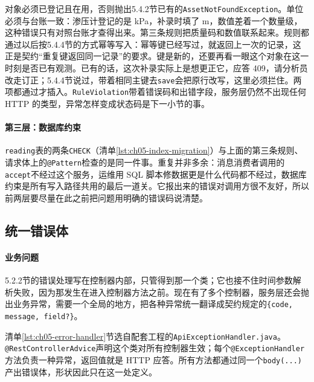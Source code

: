 对象必须已登记且在用，否则抛出5.4.2节已有的\texttt{AssetNotFoundException}。单位必须与台账一致：渗压计登记的是 kPa，补录时填了 m，数值差着一个数量级，这种错误只有对照台账才查得出来。第三条规则把质量码和数值联系起来。规则都通过以后按5.4.4节的方式幂等写入：幂等键已经写过，就返回上一次的记录，这正是契约“重复键返回同一记录”的要求。键是新的，还要再看一眼这个对象在这一时刻是否已有观测。已有的话，这次补录实际上是想更正它，应答 409，请分析员改走订正；5.4.4节说过，带着相同主键去\texttt{save}会把原行改写，这里必须拦住。两项都通过才插入。\texttt{RuleViolation}带着错误码和出错字段，服务层仍然不出现任何 HTTP 的类型，异常怎样变成状态码是下一小节的事。

\paragraph{第三层：数据库约束}\texttt{reading}表的两条\texttt{CHECK}（清单\ref{lst:ch05-index-migration}）与上面的第三条规则、请求体上的\texttt{@Pattern}检查的是同一件事。重复并非多余：消息消费者调用的\texttt{accept}不经过这个服务，运维用 SQL 脚本修数据更是什么代码都不经过，数据库约束是所有写入路径共用的最后一道关。它报出来的错误对调用方很不友好，所以前两层要尽量在此之前把问题用明确的错误码说清楚。

\subsection{统一错误体}

\paragraph{业务问题}5.2.2节的错误处理写在控制器内部，只管得到那一个类；它也接不住时间参数解析失败，因为那发生在进入控制器方法之前。现在有了多个控制器，服务层还会抛出业务异常，需要一个全局的地方，把各种异常统一翻译成契约规定的\texttt{\{code, message, field?\}}。

清单\ref{lst:ch05-error-handler}节选自配套工程的\texttt{ApiExceptionHandler.java}。\texttt{@RestControllerAdvice}声明这个类对所有控制器生效；每个\texttt{@ExceptionHandler}方法负责一种异常，返回值就是 HTTP 应答。所有方法都通过同一个\texttt{body(...)}产出错误体，形状因此只在这一处定义。

